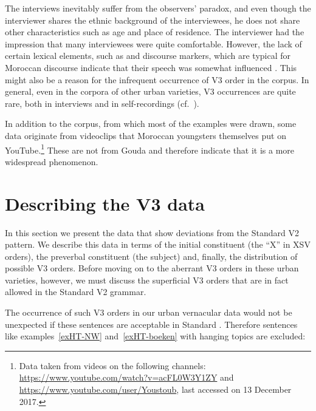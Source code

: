 \documentclass[output=paper]{langsci/langscibook}
\begin{document}
The interviews inevitably suffer from the observers' paradox, and even though
the interviewer shares the ethnic background of the interviewees, he does not
share other characteristics such as age and place of residence. The interviewer
had the impression that many interviewees were quite comfortable. However, the
lack of certain lexical elements, such as  and 
discourse markers, which are typical for Moroccan  discourse
indicate that their speech was somewhat influenced \citep{Kossmann:fc}. This
might also be a reason for the infrequent occurrence of V3
order in the corpus. In general, even in the corpora of other 
urban varieties, V3 occurrences are quite rare, both in
interviews and in self-recordings (cf.\ \citealt{Ganuza:2008}).

In addition to the corpus, from which most of the examples were drawn, some
data originate from videoclips that Moroccan  youngsters themselves put on
YouTube.\footnote{Data taken from videos on the following channels:
    \url{https://www.youtube.com/watch?v=acFL0W3Y1ZY} and
\url{https://www.youtube.com/user/Youstoub}, last accessed on 13 December
2017.} These are not from Gouda and therefore indicate that it is a more
widespread phenomenon.

\section{Describing the V3 data}
\label{sec:data}

\noindent In this section we present the data that show deviations from the
Standard  V2 pattern. We describe this data in terms of the initial
constituent (the \enquote{X} in XSV orders), the preverbal constituent (the
subject) and, finally, the distribution of possible V3 orders. Before moving on
to the aberrant V3 orders in these urban varieties, however, we must discuss
the superficial V3 orders that are in fact allowed in the Standard  V2
grammar.

\largerpage
The occurrence of such V3 orders in our urban vernacular data would not be
unexpected if these sentences are acceptable in Standard . Therefore
sentences like examples~\eqref{exHT-NW} and~\eqref{exHT-boeken} with hanging
topics are excluded:
\end{document}
